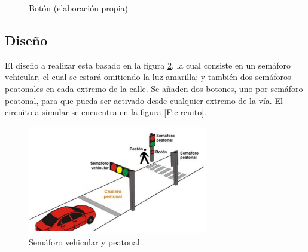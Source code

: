 \documentclass[12pt,letterpaper]{article}     %
\begin{document}
\begin{figure}[H]
 \centering
 \caption{Botón (elaboración propia)}
 \label{f:pulsador}
\end{figure}

\subsection{Diseño}
El diseño a realizar esta basado en la figura \ref{F:semaforo}, la cual consiste en un semáforo vehicular, el cual se estará omitiendo la luz amarilla; y también dos semáforos peatonales en cada extremo de la calle. Se añaden dos botones, uno por semáforo peatonal, para que pueda ser activado desde cualquier extremo de la vía. El circuito a simular se encuentra en la figura \ref{F:circuito}.

\begin{figure}[H]
    \centering
    \includegraphics[width=0.7\textwidth]{imagenes/semaforo.png}
    \caption{Semáforo vehicular y peatonal.}
    \label{F:semaforo}
\end{figure}
\end{document}
